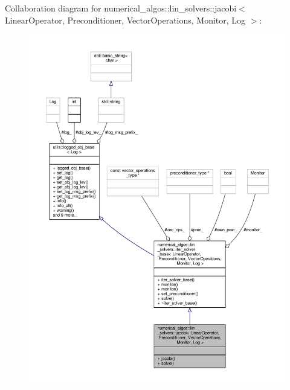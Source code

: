 Collaboration diagram for numerical\-\_\-algos\-:\-:lin\-\_\-solvers\-:\-:jacobi$<$ Linear\-Operator, Preconditioner, Vector\-Operations, Monitor, Log $>$\-:\nopagebreak
\begin{figure}[H]
\begin{center}
\leavevmode
\includegraphics[width=350pt]{classnumerical__algos_1_1lin__solvers_1_1jacobi__coll__graph}
\end{center}
\end{figure}

